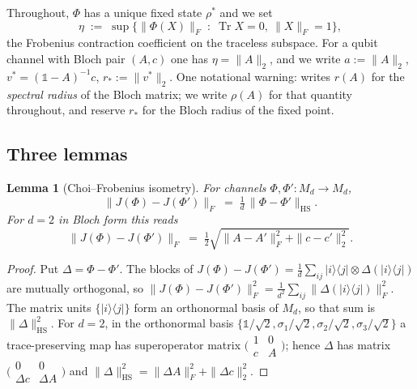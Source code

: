 \documentclass[11pt,a4paper]{article}
\newtheorem{lemma}[theorem]{Lemma}
\theoremstyle{definition}
\theoremstyle{remark}
\newcommand{\openone}{\mathbb{1}}%
\providecommand{\ket}[1]{|#1\rangle}
\providecommand{\bra}[1]{\langle#1|}
\begin{document}
Throughout, $\Phi$ has a unique fixed state $\rho^\ast$ and we set
\begin{equation}
  \eta \;:=\; \sup\bigl\{\|\Phi(X)\|_F \;:\; \operatorname{Tr}X=0,\ \|X\|_F=1\bigr\},
\end{equation}
the Frobenius contraction coefficient on the traceless subspace. For a qubit
channel with Bloch pair $(A,c)$ one has $\eta=\|A\|_2$, and we write
$a:=\|A\|_2$, $v^\ast=(\openone-A)^{-1}c$, $r_\ast:=\|v^\ast\|_2$. One notational
warning: \cite{PaperI} writes $r(A)$ for the \emph{spectral radius} of the Bloch
matrix; we write $\rho(A)$ for that quantity throughout, and reserve $r_\ast$
for the Bloch radius of the fixed point.

\subsection{Three lemmas}

\begin{lemma}[Choi--Frobenius isometry]\label{lem:iso}
For channels $\Phi,\Phi':M_d\to M_d$,
\begin{equation}
  \bigl\|J(\Phi)-J(\Phi')\bigr\|_F \;=\; \tfrac1d\,\|\Phi-\Phi'\|_{\mathrm{HS}} .
\end{equation}
For $d=2$ in Bloch form this reads
\begin{equation}\label{eq:iso2}
  \bigl\|J(\Phi)-J(\Phi')\bigr\|_F
  \;=\; \tfrac12\sqrt{\|A-A'\|_F^{2}+\|c-c'\|_2^{2}} .
\end{equation}
\end{lemma}

\begin{proof}
Put $\Delta=\Phi-\Phi'$. The blocks of
$J(\Phi)-J(\Phi')=\frac1d\sum_{ij}\ket{i}\bra{j}\otimes\Delta(\ket{i}\bra{j})$
are mutually orthogonal, so
$\|J(\Phi)-J(\Phi')\|_F^2=\frac1{d^2}\sum_{ij}\|\Delta(\ket{i}\bra{j})\|_F^2$.
The matrix units $\{\ket{i}\bra{j}\}$ form an orthonormal basis of $M_d$, so
that sum is $\|\Delta\|_{\mathrm{HS}}^2$. For $d=2$, in the orthonormal basis
$\{\openone/\sqrt2,\sigma_1/\sqrt2,\sigma_2/\sqrt2,\sigma_3/\sqrt2\}$ a
trace-preserving map has superoperator matrix
$\bigl(\begin{smallmatrix}1&0\\ c&A\end{smallmatrix}\bigr)$; hence $\Delta$ has
matrix $\bigl(\begin{smallmatrix}0&0\\ \Delta c&\Delta A\end{smallmatrix}\bigr)$
and $\|\Delta\|_{\mathrm{HS}}^2=\|\Delta A\|_F^2+\|\Delta c\|_2^2$.
\end{proof}
\end{document}
